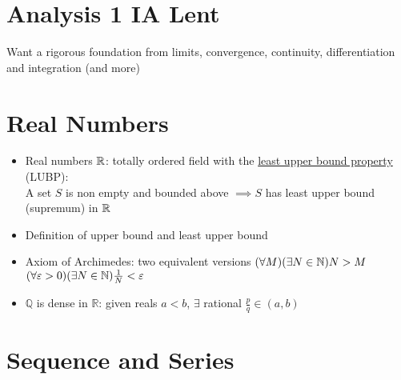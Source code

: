 



\section*{Analysis 1 \hfill IA Lent}

Want a rigorous foundation from limits, convergence, continuity, differentiation and integration (and more)

\section{Real Numbers}
\begin{itemize}
      \item Real numbers $\mathbb{R}$: totally ordered field with the \underline{least upper bound property} (LUBP): \\
            A set $S$ is non empty and bounded above $\implies S$ has least upper bound (supremum) in $\mathbb{R}$
      \item Definition of upper bound and least upper bound
      \item Axiom of Archimedes: two equivalent versions
            $ (\forall M)(\exists N \in \mathbb{N}) N > M$ \\
            $(\forall \varepsilon > 0)(\exists N \in \mathbb{N} )\frac{1}{N} < \varepsilon$
      \item $\mathbb{Q}$  is dense in $\mathbb{R}$: given reals $a < b$, $\exists$ rational $ \frac{p}{q} \in (a,b)$
\end{itemize}

\section{Sequence and Series}
